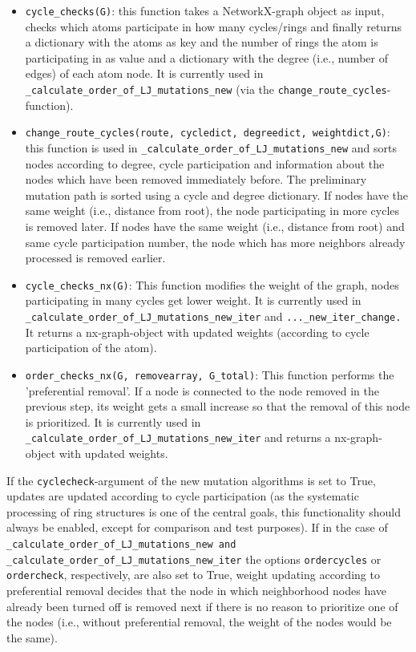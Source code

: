 \begin{itemize}
\item \texttt{cycle\_checks(G)}: this function takes a NetworkX-graph object as input, checks which atoms participate
in how many cycles/rings and finally returns a dictionary with the atoms as
key and the number of rings the atom is participating in as value
and a dictionary with the degree (i.e., number of edges) of each atom
node. It is currently used in \texttt{\_calculate\_order\_of\_LJ\_mutations\_new}
(via the \texttt{change\_route\_cycles}-function).

\item \begin{sloppypar}\texttt{change\_route\_cycles\string(route, cycledict, degreedict, weightdict,G\string)}: this function is used in \texttt{\_calculate\_order\_of\_LJ\_mutations\_new}
and sorts nodes according to degree, cycle participation and information
about the nodes which have been removed immediately before. The preliminary mutation
path is sorted using a cycle and degree dictionary. If nodes have the same
weight (i.e., distance from root), the node participating in more cycles
is removed later. If nodes have the same weight (i.e., distance from root)
and same cycle participation number, the node which has more neighbors
already processed is removed earlier.\end{sloppypar}

\item \texttt{cycle\_checks\_nx(G)}: This function modifies the weight of
the graph, nodes participating in many cycles get lower weight. It
is currently used in 
\texttt{\_calculate\_order\_of\_LJ\_mutations\_new\_iter} and \texttt{...\_new\_iter\_change.} It returns a nx-graph-object
with updated weights (according to cycle participation of the atom).

\item \texttt{order\_checks\_nx(G, removearray, G\_total)}: This function
performs the 'preferential removal'. If a node is connected to the
node removed in the previous step, its weight gets a small increase so
that the removal of this node is prioritized. It is currently used
in\texttt{ \_calculate\_order\_of\_LJ\_mutations\_new\_iter} and returns
a nx-graph-object with updated weights.
\end{itemize}

If the \texttt{cyclecheck}-argument of the new mutation algorithms is set to True,
updates are updated according to cycle participation (as the systematic
processing of ring structures is one of the central goals, this functionality
should always be enabled, except for comparison and test purposes).
If in the case of \texttt{\_calculate\_order\_of\_LJ\_mutations\_new
and \_calculate\_order\_of\_LJ\_mutations\_new\_iter} the options  \texttt{ordercycles}
or \texttt{ordercheck}, respectively, are also set to True, weight updating according
to preferential removal decides that the node in which neighborhood
nodes have already been turned off is removed next if there is no
reason to prioritize one of the nodes (i.e., without preferential removal, the weight of the nodes
would be the same).


